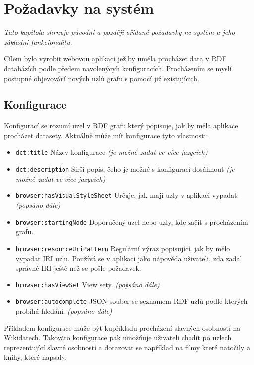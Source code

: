 \chapter{Požadavky na systém}
\textit{Tato kapitola shrnuje původní a později přidané požadavky na systém a jeho základní funkcionalitu.}

Cílem bylo vyrobit webovou aplikaci jež by uměla procházet data v RDF databázích podle předem navolenýcyh konfiguracích. Procházením se myslí postupné objevování nových uzlů grafu s pomocí již existujících.

\section{Konfigurace}
Konfigurací se rozumí uzel v RDF grafu který popisuje, jak by měla aplikace procházet datasety. Aktuálně může mít konfigurace tyto vlastnosti:

\begin{itemize}
    \item \texttt{dct:title} Název konfigurace \textit{(je možné zadat ve více jazycích)}
    \item \texttt{dct:description} Širší popis, čeho je možné s konfigurací dosáhnout \textit{(je možné zadat ve více jazycích)}
    \item \texttt{browser:hasVisualStyleSheet} Určuje, jak mají uzly v aplikaci vypadat. \textit{(popsáno dále)}
    \item \texttt{browser:startingNode} Doporučený uzel nebo uzly, kde začít s procházením grafu.
    \item \texttt{browser:resourceUriPattern} Regulární výraz popisující, jak by mělo vypadat IRI uzlu. Používá se v aplikaci jako nápověda uživateli, zda zadal správné IRI ještě než se pošle požadavek.
    \item \texttt{browser:hasViewSet} View sety. \textit{(popsáno dále)}
    \item \texttt{browser:autocomplete} JSON soubor se seznamem RDF uzlů podle kterých probíhá hledání. \textit{(popsáno dále)}
\end{itemize}

Příkladem konfigurace může být kupříkladu procházení slavných osobností na Wikidatech. Takováto konfigurace pak umožňuje uživateli chodit po uzlech reprezentující slavné osobnosti a dotazovat se například na filmy které natočily a knihy, které napsaly.

